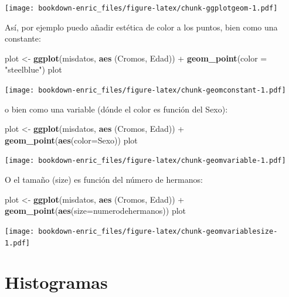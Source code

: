 \documentclass[]{book}
\newenvironment{Shaded}{\begin{snugshade}}{\end{snugshade}}
\newcommand{\KeywordTok}[1]{\textcolor[rgb]{0.13,0.29,0.53}{\textbf{{#1}}}}
\newcommand{\DataTypeTok}[1]{\textcolor[rgb]{0.13,0.29,0.53}{{#1}}}
\newcommand{\StringTok}[1]{\textcolor[rgb]{0.31,0.60,0.02}{{#1}}}
\newcommand{\NormalTok}[1]{{#1}}
\theoremstyle{definition}
\theoremstyle{definition}
\theoremstyle{remark}
\begin{document}
\texttt{[image: bookdown-enric\_files/figure-latex/chunk-ggplotgeom-1.pdf]}

Así, por ejemplo puedo añadir estética de color a los puntos, bien como
una constante:

\begin{Shaded}
\begin{Highlighting}[]
\NormalTok{plot <-}\StringTok{ }\KeywordTok{ggplot}\NormalTok{(misdatos, }\KeywordTok{aes} \NormalTok{(Cromos, Edad)) +}\StringTok{ }\KeywordTok{geom_point}\NormalTok{(}\DataTypeTok{color =} \StringTok{"steelblue"}\NormalTok{)}
\NormalTok{plot}
\end{Highlighting}
\end{Shaded}

\texttt{[image: bookdown-enric\_files/figure-latex/chunk-geomconstant-1.pdf]}

o bien como una variable (dónde el color es función del Sexo):

\begin{Shaded}
\begin{Highlighting}[]
\NormalTok{plot <-}\StringTok{ }\KeywordTok{ggplot}\NormalTok{(misdatos, }\KeywordTok{aes} \NormalTok{(Cromos, Edad)) +}\StringTok{ }\KeywordTok{geom_point}\NormalTok{(}\KeywordTok{aes}\NormalTok{(}\DataTypeTok{color=}\NormalTok{Sexo))}
\NormalTok{plot}
\end{Highlighting}
\end{Shaded}

\texttt{[image: bookdown-enric\_files/figure-latex/chunk-geomvariable-1.pdf]}

O el tamaño (size) es función del número de hermanos:

\begin{Shaded}
\begin{Highlighting}[]
\NormalTok{plot <-}\StringTok{ }\KeywordTok{ggplot}\NormalTok{(misdatos, }\KeywordTok{aes} \NormalTok{(Cromos, Edad)) +}\StringTok{ }\KeywordTok{geom_point}\NormalTok{(}\KeywordTok{aes}\NormalTok{(}\DataTypeTok{size=}\NormalTok{numerodehermanos))}
\NormalTok{plot}
\end{Highlighting}
\end{Shaded}

\texttt{[image: bookdown-enric\_files/figure-latex/chunk-geomvariablesize-1.pdf]}

\section{Histogramas}\label{histogramas}
\end{document}
